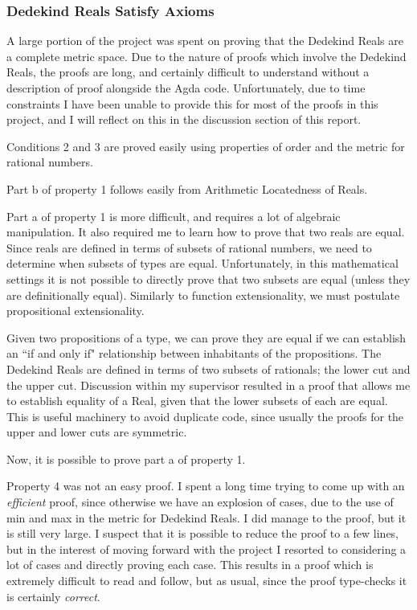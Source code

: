 \documentclass[ProjectReport]{subfiles}
\begin{document}
\subsubsection{Dedekind Reals Satisfy Axioms}

A large portion of the project was spent on proving that the Dedekind Reals are a complete metric space. Due to the nature of proofs which involve the Dedekind Reals, the proofs are long, and certainly difficult to understand without a description of proof alongside the Agda code. Unfortunately, due to time constraints I have been unable to provide this for most of the proofs in this project, and I will reflect on this in the discussion section of this report.

Conditions 2 and 3 are proved easily using properties of order and the metric for rational numbers. 


Part b of property 1 follows easily from Arithmetic Locatedness of Reals.


Part a of property 1 is more difficult, and requires a lot of algebraic manipulation. It also required me to learn how to prove that two reals are equal. Since reals are defined in terms of subsets of rational numbers, we need to determine when subsets of types are equal. Unfortunately, in this mathematical settings it is not possible to directly prove that two subsets are equal (unless they are definitionally equal). Similarly to function extensionality, we must postulate propositional extensionality.


Given two propositions of a type, we can prove they are equal if we can establish an ``if and only if" relationship between inhabitants of the propositions. The Dedekind Reals are defined in terms of two subsets of rationals; the lower cut and the upper cut. Discussion within my supervisor resulted in a proof that allows me to establish equality of a Real, given that the lower subsets of each are equal. This is useful machinery to avoid duplicate code, since usually the proofs for the upper and lower cuts are symmetric.


Now, it is possible to prove part a of property 1. 


Property 4 was not an easy proof. I spent a long time trying to come up with an \textit{efficient} proof, since otherwise we have an explosion of cases, due to the use of min and max in the metric for Dedekind Reals. I did manage to the proof, but it is still very large. I suspect that it is possible to reduce the proof to a few lines, but in the interest of moving forward with the project I resorted to considering a lot of cases and directly proving each case. This results in a proof which is extremely difficult to read and follow, but as usual, since the proof type-checks it is certainly \textit{correct}.
\end{document}
